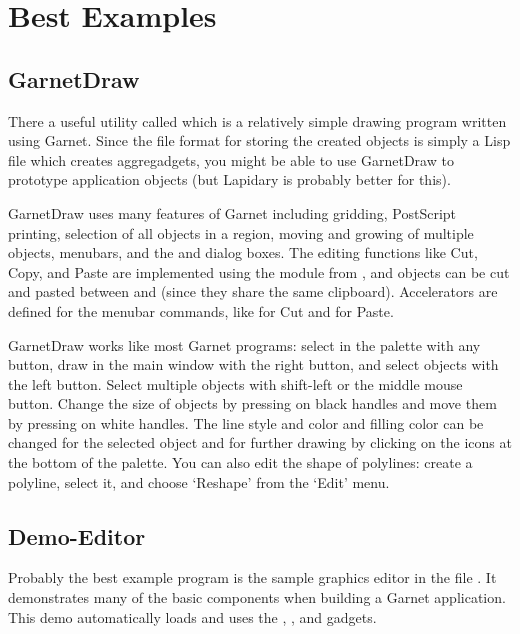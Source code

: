 \section{Best Examples}

\subsection{GarnetDraw}
There a useful utility called  which is a
relatively simple drawing program written using Garnet.  Since the file format
for storing the created objects is simply a Lisp file which creates
aggregadgets, you might be able to use GarnetDraw to prototype
application objects (but Lapidary is probably better for this).

GarnetDraw uses many features of Garnet including gridding, PostScript
printing, selection of all objects in a region, moving and growing of multiple
objects, menubars, and the  and  dialog boxes.
The editing functions like Cut, Copy, and Paste are
implemented using the  module from ,
and objects can be cut and pasted between  and 
(since they share the same clipboard).  Accelerators are defined for the
menubar commands, like  for Cut and
 for Paste.

GarnetDraw works like most Garnet programs: select in the palette
with any button, draw in the main window with the right button, and select
objects with the left button.  Select multiple objects with shift-left or
the middle mouse button.  Change the size of objects by pressing on black
handles and move them by pressing on
white handles.  The line style and color and filling color can be
changed for the selected object and for further drawing by clicking on
the icons at the bottom of the palette.
You can also edit the shape of polylines:
create a polyline, select it, and choose `Reshape' from the `Edit' menu.

\subsection{Demo-Editor}
\label{demoeditor}
Probably the best example program is the sample graphics editor in the
file .
It demonstrates many of the basic components when building a Garnet
application.  This demo automatically loads and uses the
, , and 
gadgets.


